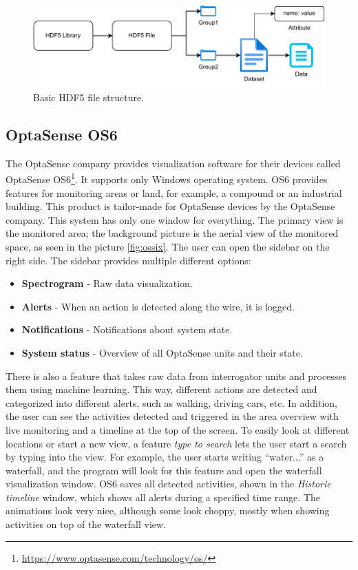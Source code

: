 \begin{figure}
    \centering
    \includegraphics[width=\linewidth]{pdf/hdf5_file_structure.pdf}
    \caption{Basic HDF5 file structure.}
    \label{fig:filestructure}
\end{figure}



\subsection{OptaSense OS6}\label{txt.design.optasense}

The OptaSense company provides visualization software for their devices called OptaSense OS6\footnote{\url{https://www.optasense.com/technology/os/}}. It supports only Windows operating system. OS6 provides features for monitoring areas or land, for example, a compound or an industrial building. This product is tailor-made for OptaSense devices by the OptaSense company. This system has only one window for everything. The primary view is the monitored area; the background picture is the aerial view of the monitored space, as seen in the picture \ref{fig:ossix}. The user can open the sidebar on the right side. The sidebar provides multiple different options:

\begin{itemize}
    \item \textbf{Spectrogram} - Raw data visualization.
    \item \textbf{Alerts} - When an action is detected along the wire, it is logged.
    \item \textbf{Notifications} -  Notifications about system state.
    \item \textbf{System status} - Overview of all OptaSense units and their state.
\end{itemize}

There is also a feature that takes raw data from interrogator units and processes them using machine learning. This way, different actions are detected and categorized into different alerts, such as walking, driving cars, etc. In addition, the user can see the activities detected and triggered in the area overview with live monitoring and a timeline at the top of the screen. To easily look at different locations or start a new view, a feature \textit{type to search} lets the user start a search by typing into the view. For example, the user starts writing ``water...'' as a waterfall, and the program will look for this feature and open the waterfall visualization window. OS6 saves all detected activities, shown in the \textit{Historic timeline} window, which shows all alerts during a specified time range. The animations look very nice, although some look choppy, mostly when showing activities on top of the waterfall view. 


